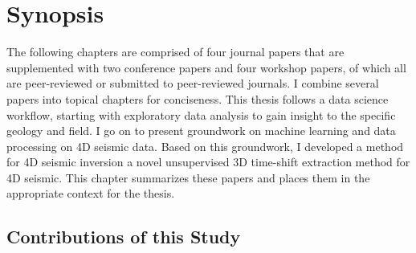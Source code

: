 \chapter{Synopsis}
\label{sec:synopsis}
The following chapters are comprised of four journal papers that are supplemented with two conference papers and four workshop papers, of which all are peer-reviewed or submitted to peer-reviewed journals. I combine several papers into topical chapters for conciseness. This thesis follows a data science workflow, starting with exploratory data analysis to gain insight to the specific geology and field. I go on to present groundwork on machine learning and data processing on 4D seismic data. Based on this groundwork, I developed a method for 4D seismic inversion a novel unsupervised 3D time-shift extraction method for 4D seismic. This chapter summarizes these papers and places them in the appropriate context for the thesis.









\section{Contributions of this Study}

